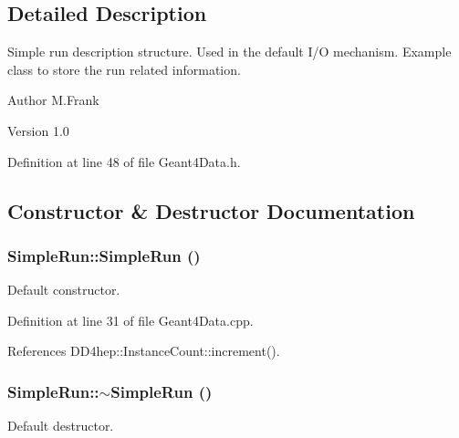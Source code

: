 \subsection{Detailed Description}
Simple run description structure. Used in the default I/O mechanism. Example class to store the run related information.

\begin{DoxyAuthor}{Author}
M.Frank 
\end{DoxyAuthor}
\begin{DoxyVersion}{Version}
1.0 
\end{DoxyVersion}


Definition at line 48 of file Geant4Data.h.

\subsection{Constructor \& Destructor Documentation}
\hypertarget{class_d_d4hep_1_1_simulation_1_1_simple_run_a50e522275d994ec00d6e3a2d842713d5}{
\subsubsection[{SimpleRun}]{\setlength{\rightskip}{0pt plus 5cm}SimpleRun::SimpleRun ()}}
\label{class_d_d4hep_1_1_simulation_1_1_simple_run_a50e522275d994ec00d6e3a2d842713d5}


Default constructor. 

Definition at line 31 of file Geant4Data.cpp.

References DD4hep::InstanceCount::increment().\hypertarget{class_d_d4hep_1_1_simulation_1_1_simple_run_a492b495267498387129a39d1c3da0850}{
\subsubsection[{$\sim$SimpleRun}]{\setlength{\rightskip}{0pt plus 5cm}SimpleRun::$\sim$SimpleRun ()}}
\label{class_d_d4hep_1_1_simulation_1_1_simple_run_a492b495267498387129a39d1c3da0850}


Default destructor. 

